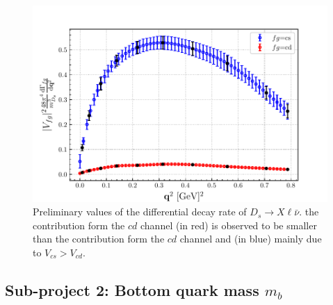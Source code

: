 \begin{figure}
  \centering
  \includegraphics[scale=0.8]{plots/final_DgammaDq2.pdf}
  \caption{Preliminary values of the differential decay rate of
  $D_s\to X\ell\bar\nu$.
  the contribution form the $cd$ channel (in red) is observed to be smaller than
  the contribution form the $cd$ channel and (in blue) mainly due to $V_{cs}>V_{cd}$.}
  \label{fig:dGammadq_Ds}
\end{figure}


\subsection{Sub-project 2: Bottom quark mass $m_b$}
\label{sec:mb}

